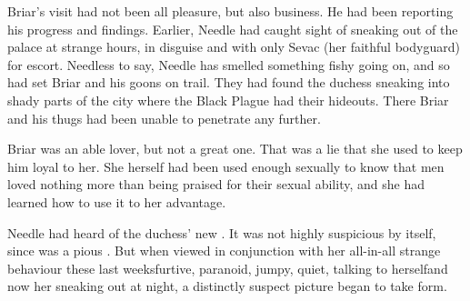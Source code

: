 Briar's visit had not been all pleasure, but also business. 
He had been reporting his progress and findings. 
Earlier, Needle had caught sight of \Tiroco{} sneaking out of the palace at strange hours, in disguise and with only Sevac (her faithful bodyguard) for escort. 
Needless to say, Needle has smelled something fishy going on, and so had set Briar and his goons on \Tirocoz{} trail. 
They had found the duchess sneaking into shady parts of the city where the Black Plague had their hideouts. 
There Briar and his thugs had been unable to penetrate any further. 

Briar was an able lover, but not a great one. 
That was a lie that she used to keep him loyal to her. 
She herself had been used enough sexually to know that men loved nothing more than being praised for their sexual ability, and she had learned how to use it to her advantage. 

Needle had heard of the duchess' new . 
It was not highly suspicious by itself, since \Tiroco{} was a pious . 
But when viewed in conjunction with her all-in-all strange behaviour these last weeks\dash furtive, paranoid, jumpy, quiet, talking to herself\dash and now her sneaking out at night, a distinctly suspect picture began to take form. 










